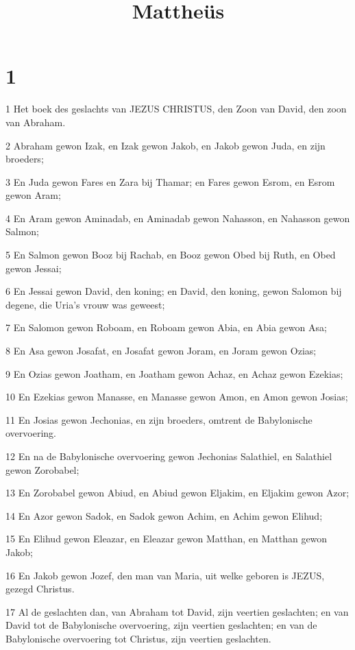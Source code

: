 

\title{Mattheüs}



\chapter{1}

\par 1 Het boek des geslachts van JEZUS CHRISTUS, den Zoon van David, den zoon van Abraham.
\par 2 Abraham gewon Izak, en Izak gewon Jakob, en Jakob gewon Juda, en zijn broeders;
\par 3 En Juda gewon Fares en Zara bij Thamar; en Fares gewon Esrom, en Esrom gewon Aram;
\par 4 En Aram gewon Aminadab, en Aminadab gewon Nahasson, en Nahasson gewon Salmon;
\par 5 En Salmon gewon Booz bij Rachab, en Booz gewon Obed bij Ruth, en Obed gewon Jessai;
\par 6 En Jessai gewon David, den koning; en David, den koning, gewon Salomon bij degene, die Uria's vrouw was geweest;
\par 7 En Salomon gewon Roboam, en Roboam gewon Abia, en Abia gewon Asa;
\par 8 En Asa gewon Josafat, en Josafat gewon Joram, en Joram gewon Ozias;
\par 9 En Ozias gewon Joatham, en Joatham gewon Achaz, en Achaz gewon Ezekias;
\par 10 En Ezekias gewon Manasse, en Manasse gewon Amon, en Amon gewon Josias;
\par 11 En Josias gewon Jechonias, en zijn broeders, omtrent de Babylonische overvoering.
\par 12 En na de Babylonische overvoering gewon Jechonias Salathiel, en Salathiel gewon Zorobabel;
\par 13 En Zorobabel gewon Abiud, en Abiud gewon Eljakim, en Eljakim gewon Azor;
\par 14 En Azor gewon Sadok, en Sadok gewon Achim, en Achim gewon Elihud;
\par 15 En Elihud gewon Eleazar, en Eleazar gewon Matthan, en Matthan gewon Jakob;
\par 16 En Jakob gewon Jozef, den man van Maria, uit welke geboren is JEZUS, gezegd Christus.
\par 17 Al de geslachten dan, van Abraham tot David, zijn veertien geslachten; en van David tot de Babylonische overvoering, zijn veertien geslachten; en van de Babylonische overvoering tot Christus, zijn veertien geslachten.
